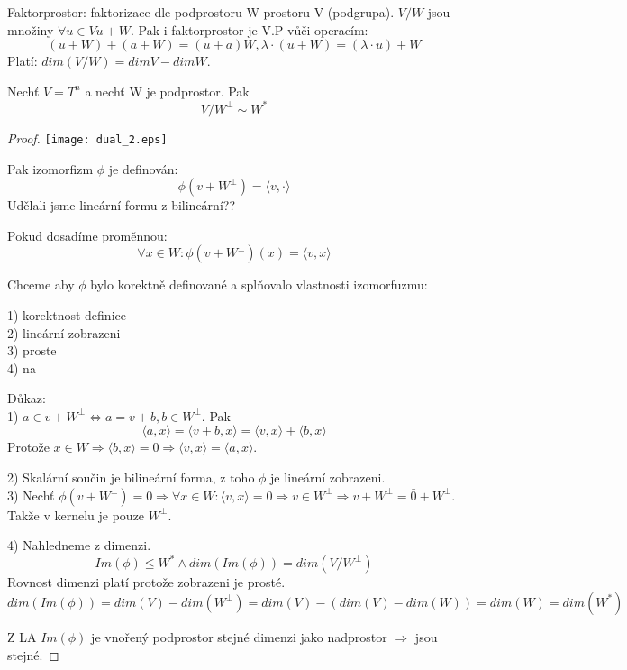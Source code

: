 \begin{definition}
Faktorprostor: faktorizace dle podprostoru W prostoru V (podgrupa). $V/W$ jsou množiny $\forall u \in V u + W$. Pak i faktorprostor je V.P vůči operacím:
\[ (u + W) + (a + W) = (u + a)W, \lambda \cdot (u + W) = (\lambda \cdot u) + W \]
Platí: $dim(V/W) = dimV - dim W$.
\end{definition}

\begin{theorem}
	Nechť $V = T^n$ a nechť W je podprostor. Pak
	\[ V/W^{\perp} \sim W^{\ast} \]
\end{theorem}
\begin{proof}
	\texttt{[image: dual\_2.eps]}

	Pak izomorfizm $\phi$ je definován:
	\[\phi(v + W^{\perp}) = \langle v, \cdot \rangle \]
	Udělali jsme lineární formu z bilineární??

	Pokud dosadíme proměnnou:
	\[\forall x \in W: \phi(v + W^{\perp})(x) = \langle v, x \rangle \]

	Chceme aby $\phi$ bylo korektně definované a splňovalo vlastnosti izomorfuzmu:

	1) korektnost definice \\
	2) lineární zobrazeni \\
	3) proste\\
	4) na

	Důkaz:\\
	1) $a \in v + W^{\perp} \iff a = v + b, b \in W^{\perp}$. Pak
	\[ \langle a, x \rangle = \langle v + b, x \rangle = \langle v, x \rangle + \langle b, x \rangle\]
	Protože $x \in W \Rightarrow \langle b, x \rangle = 0 \Rightarrow \langle v, x \rangle = \langle a, x \rangle $.

	2) Skalární součin je bilineární forma, z toho $\phi$ je lineární zobrazeni.\\
	3) Nechť $\phi(v + W^{\perp}) = 0 \Rightarrow \forall x \in W : \langle v, x \rangle = 0 \Rightarrow v \in W^{\perp} \Rightarrow v + W^{\perp} = \bar{0} + W^{\perp}$.
	Takže v kernelu je pouze $W^{\perp}$.

	4) Nahledneme z dimenzi.
	\[ Im(\phi) \leq W^{\ast} \land dim(Im(\phi)) = dim (V/W^{\perp}) \]
	Rovnost dimenzi platí protože zobrazeni je prosté.
	\[ dim(Im(\phi)) = dim(V) - dim(W^{\perp}) = dim(V) - (dim(V) - dim(W)) = dim(W) = dim(W^{\ast}) \]

	Z LA $Im(\phi)$ je vnořený podprostor stejné dimenzi jako nadprostor $\Rightarrow$ jsou stejné.

\end{proof}


